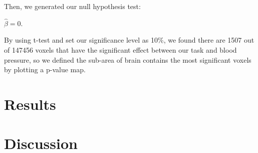 \documentclass[11pt]{article}
\begin{document}
Then, we generated our null hypothesis test:

$\hat{\beta} = 0$.

By using t-test and set our significance level as 10\%, we found there are 1507 
out of 147456 voxels that have the significant effect between our task and 
blood pressure, so we defined the sub-area of brain contains the most 
significant voxels by plotting a p-value map.

\section{Results}
\section{Discussion}



\end{document}
